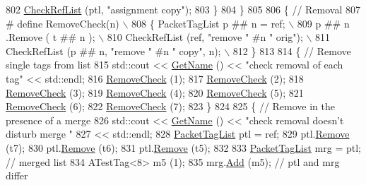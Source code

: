 \begin{DoxyCode}
802       \hyperlink{classPacketTagListTest_a3cbb0392f10206f2eb9e593bd6341f72}{CheckRefList} (ptl, \textcolor{stringliteral}{"assignment copy"});
803     \}
804   \}
805   
806   \{ \textcolor{comment}{// Removal}
807 \textcolor{preprocessor}{#   define RemoveCheck(n)                               \(\backslash\)}
808 \textcolor{preprocessor}{    \{ PacketTagList p ## n = ref;                       \(\backslash\)}
809 \textcolor{preprocessor}{      p ## n .Remove ( t ## n );                        \(\backslash\)}
810 \textcolor{preprocessor}{      CheckRefList (ref,     "remove " #n " orig");     \(\backslash\)}
811 \textcolor{preprocessor}{      CheckRefList (p ## n, "remove " #n " copy", n);   \(\backslash\)}
812 \textcolor{preprocessor}{    \}}
813     
814     \{ \textcolor{comment}{// Remove single tags from list}
815       std::cout << \hyperlink{classns3_1_1TestCase_a28f7bb59669c24dae1c290fc17fc9b62}{GetName} () << \textcolor{stringliteral}{"check removal of each tag"} << std::endl;
816       \hyperlink{packet-test-suite_8cc_aaba610d23c4d67308f432da03a0b6a5b}{RemoveCheck} (1);
817       \hyperlink{packet-test-suite_8cc_aaba610d23c4d67308f432da03a0b6a5b}{RemoveCheck} (2);
818       \hyperlink{packet-test-suite_8cc_aaba610d23c4d67308f432da03a0b6a5b}{RemoveCheck} (3);
819       \hyperlink{packet-test-suite_8cc_aaba610d23c4d67308f432da03a0b6a5b}{RemoveCheck} (4);
820       \hyperlink{packet-test-suite_8cc_aaba610d23c4d67308f432da03a0b6a5b}{RemoveCheck} (5);
821       \hyperlink{packet-test-suite_8cc_aaba610d23c4d67308f432da03a0b6a5b}{RemoveCheck} (6);
822       \hyperlink{packet-test-suite_8cc_aaba610d23c4d67308f432da03a0b6a5b}{RemoveCheck} (7);
823     \}
824     
825     \{ \textcolor{comment}{// Remove in the presence of a merge}
826       std::cout << \hyperlink{classns3_1_1TestCase_a28f7bb59669c24dae1c290fc17fc9b62}{GetName} () << \textcolor{stringliteral}{"check removal doesn't disturb merge "}
827                 << std::endl;
828       \hyperlink{classns3_1_1PacketTagList}{PacketTagList} ptl = ref;
829       ptl.\hyperlink{classns3_1_1PacketTagList_a043d984c546f67adc273448747784ee3}{Remove} (t7);
830       ptl.\hyperlink{classns3_1_1PacketTagList_a043d984c546f67adc273448747784ee3}{Remove} (t6);
831       ptl.\hyperlink{classns3_1_1PacketTagList_a043d984c546f67adc273448747784ee3}{Remove} (t5);
832       
833       \hyperlink{classns3_1_1PacketTagList}{PacketTagList} mrg = ptl;  \textcolor{comment}{// merged list}
834       ATestTag<8> m5 (1);
835       mrg.\hyperlink{classns3_1_1PacketTagList_a37f008b6f336f3ac6232d558b93e8a6e}{Add} (m5);             \textcolor{comment}{// ptl and mrg differ}

\end{DoxyCode}
